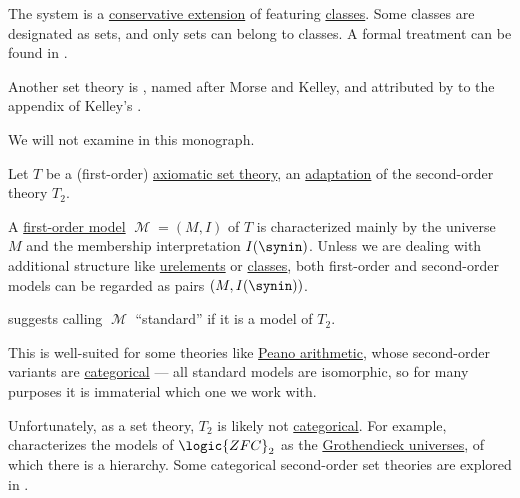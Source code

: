 \begin{remark}
\begin{thmenum}
    The system is a \hyperref[def:fol_theory/conservative]{conservative extension} of  featuring \hyperref[con:set_theory_class]{classes}. Some classes are designated as sets, and only sets can belong to classes. A formal treatment can be found in \textcite[ch. 4]{Mendelson2015Logic}.

     Another set theory is , named after Morse and Kelley, and attributed by \textcite[\S 4.6.1]{Mendelson2015Logic} to the appendix of Kelley's \cite[201]{Kelley1975GeneralTopology}.

    We will not examine  in this monograph.
  \end{thmenum}
\end{remark}

\begin{definition}\label{def:set_theory_model}\mimprovised
  Let \( T \) be a (first-order) \hyperref[def:axiomatic_set_theory]{axiomatic set theory}, an \hyperref[def:fol_adaptation_of_monadic_sol_theory]{adaptation} of the second-order theory \( T_2 \).

  A \hyperref[def:fol_semantics/model]{first-order model} \( \mscrM = (M, I) \) of \( T \) is characterized mainly by the universe \( M \) and the membership interpretation \( I(\synin) \). Unless we are dealing with additional structure like \hyperref[def:axiomatic_set_theory/atoms]{urelements} or \hyperref[con:set_theory_class]{classes}, both first-order and second-order models can be regarded as pairs \( (M, I(\synin)) \).

  \begin{thmenum}
      suggests calling \( \mscrM \) \enquote{standard} if it is a model of \( T_2 \).

    This is well-suited for some theories like \hyperref[def:peano_arithmetic]{Peano arithmetic}, whose second-order variants are \hyperref[def:hol_theory/categorical]{categorical} --- all standard models are isomorphic, so for many purposes it is immaterial which one we work with.

    Unfortunately, as a set theory, \( T_2 \) is likely not \hyperref[def:hol_theory/categorical]{categorical}. For example,  characterizes the models of \hyperref[def:zfc]{\( \logic{ZFC}_2 \)} as the \hyperref[def:grothendieck_universe]{Grothendieck universes}, of which there is a hierarchy. Some categorical second-order set theories are explored in \cite{HamkinsSolberg2020SetTheoreticReflection}.


\end{thmenum}
\end{definition}

